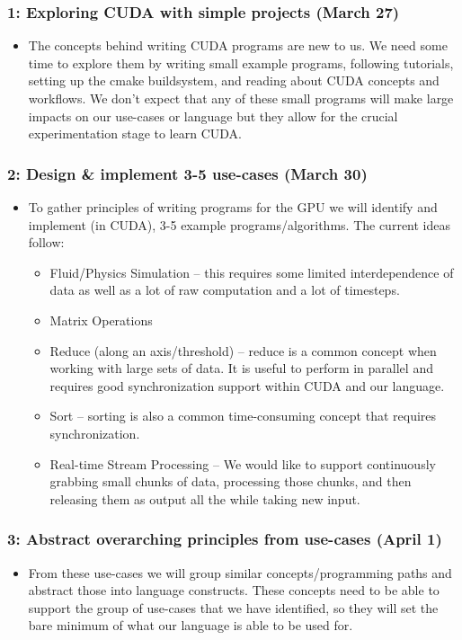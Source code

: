 \documentclass{article}
\begin{document}
\subsubsection*{1: Exploring CUDA with simple projects (March 27)}
\begin{itemize}
  \item The concepts behind writing CUDA programs are new to us. We need some time to explore them by writing small example programs, following tutorials, setting up the cmake buildsystem, and reading about CUDA concepts and workflows. We don't expect that any of these small programs will make large impacts on our use-cases or language but they allow for the crucial experimentation stage to learn CUDA.
  \end{itemize}

\subsubsection*{2: Design \& implement 3-5 use-cases (March 30)}
\begin{itemize}
  \item To gather principles of writing programs for the GPU we will identify and implement (in CUDA), 3-5 example programs/algorithms. The current ideas follow:
    \begin{itemize}
      \item Fluid/Physics Simulation -- this requires some limited interdependence of data as well as a lot of raw computation and a lot of timesteps.
      \item Matrix Operations
      \item Reduce (along an axis/threshold) -- reduce is a common concept when working with large sets of data. It is useful to perform in parallel and requires good synchronization support within CUDA and our language.
      \item Sort -- sorting is also a common time-consuming concept that requires synchronization.
      \item Real-time Stream Processing -- We would like to support continuously grabbing small chunks of data, processing those chunks, and then releasing them as output all the while taking new input. 
  \end{itemize}
\end{itemize}

\subsubsection*{3: Abstract overarching principles from use-cases (April 1)}
\begin{itemize}
  \item From these use-cases we will group similar concepts/programming paths and abstract those into language constructs. These concepts need to be able to support the group of use-cases that we have identified, so they will set the bare minimum of what our language is able to be used for.
\end{itemize}
  
\end{document}
